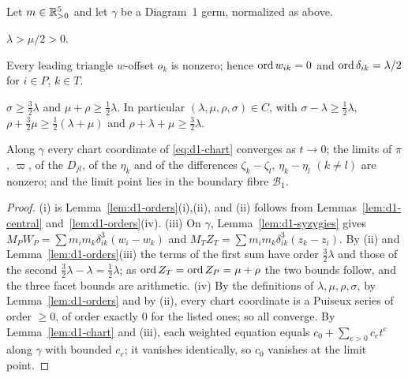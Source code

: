 \begin{proposition}[Coverage]\label{prop:d1-cover}
Let $m\in\mathbb{R}_{>0}^5$ and let $\gamma$ be a Diagram~1 germ, normalized as above.
\begin{romanlist}
  \item $\lambda>\mu/2>0$.
  \item Every leading triangle $w$-offset $o_k$ is nonzero; hence $\operatorname{ord} w_{ik}=0$ and
  $\operatorname{ord}\delta_{ik}=\lambda/2$ for $i\in P$, $k\in T$.
  \item $\sigma\ge\frac32\lambda$ and $\mu+\rho\ge\frac12\lambda$.  In particular
  $(\lambda,\mu,\rho,\sigma)\in C$, with $\sigma-\lambda\ge\frac12\lambda$,
  $\rho+\frac32\mu\ge\frac12(\lambda+\mu)$ and $\rho+\lambda+\mu\ge\frac32\lambda$.
  \item Along $\gamma$ every chart coordinate of \eqref{eq:d1-chart} converges as $t\to0$; the
  limits of $\pi$, $\varpi$, of the $D_{jl}$, of the $\eta_k$ and of the differences
  $\zeta_k-\zeta_l$, $\eta_k-\eta_l$ $(k\ne l)$ are nonzero; and the limit point lies in the
  boundary fibre $\mathcal B_1$.
\end{romanlist}
\end{proposition}

\begin{proof}
(i) is Lemma~\ref{lem:d1-orders}(i),(ii), and (ii) follows from Lemmas~\ref{lem:d1-central}
and~\ref{lem:d1-orders}(iv).  (iii) On $\gamma$, Lemma~\ref{lem:d1-syzygies} gives
$M_PW_P=\sum m_im_k\delta_{ik}^3(w_i-w_k)$ and $M_TZ_T=\sum m_im_k\delta_{ik}^3(z_k-z_i)$.  By (ii)
and Lemma~\ref{lem:d1-orders}(iii) the terms of the first sum have order $\frac32\lambda$ and
those of the second $\frac32\lambda-\lambda=\frac12\lambda$; as $\operatorname{ord} Z_T=\operatorname{ord} Z_P=\mu+\rho$ the
two bounds follow, and the three facet bounds are arithmetic.
(iv) By the definitions of $\lambda,\mu,\rho,\sigma$, by Lemma~\ref{lem:d1-orders} and by (ii),
every chart coordinate is a Puiseux series of order $\ge0$, of order exactly $0$ for the listed
ones; so all converge.  By Lemma~\ref{lem:d1-chart} and (iii), each weighted equation equals
$c_0+\sum_{e>0}c_et^e$ along $\gamma$ with bounded $c_e$; it vanishes identically, so $c_0$
vanishes at the limit point.
\end{proof}

